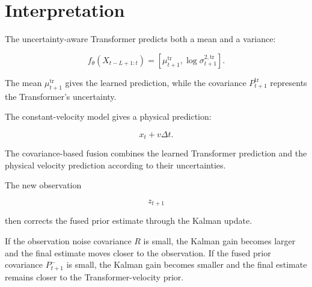 \documentclass[a4paper]{article}
\begin{document}
    
    \section{Interpretation}
        
        The uncertainty-aware Transformer predicts both a mean and a variance:
        
        \[
            f_{\theta}
            \left(
                X_{t-L+1:t}
            \right)
            =
            \left[
                \mu_{t+1}^{\mathrm{tr}},
                \log \sigma_{t+1}^{2,\mathrm{tr}}
            \right].
        \]
        
        The mean \(\mu_{t+1}^{\mathrm{tr}}\) gives the learned prediction, while the covariance \(P_{t+1}^{\mathrm{tr}}\) represents the Transformer's uncertainty.
        
        The constant-velocity model gives a physical prediction:
        
        \[
            x_t
            +
            v\Delta t.
        \]
        
        The covariance-based fusion combines the learned Transformer prediction and the physical velocity prediction according to their uncertainties.
        
        The new observation
        
        \[
            z_{t+1}
        \]
        
        then corrects the fused prior estimate through the Kalman update.
        
        If the observation noise covariance \(R\) is small, the Kalman gain becomes larger and the final estimate moves closer to the observation. If the fused prior covariance \(P_{t+1}^{-}\) is small, the Kalman gain becomes smaller and the final estimate remains closer to the Transformer-velocity prior.

%	
%	
\end{document}
